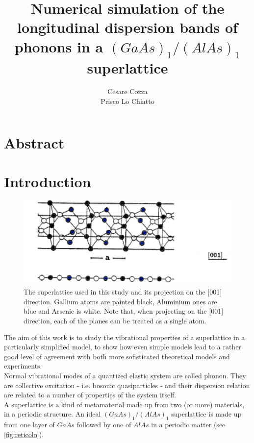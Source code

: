 \documentclass{article}
\begin{document}
 
	
	\author{Cesare Cozza \\ Prisco Lo Chiatto }
	\title{Numerical simulation of the longitudinal dispersion bands of phonons in a $(GaAs)_1/(AlAs)_1$ superlattice}
	\maketitle
    \newpage
    
    
\section{Abstract}




\section{Introduction}
\begin{figure}
	\centering
	\includegraphics[scale=0.3]{reticolo.jpg}
	\caption{The superlattice used in this study and its projection on the [001] direction. Gallium atoms are painted black, Aluminium ones are blue and Arsenic is white. Note that, when projecting on the [001] direction, each of the planes can be treated as a single atom.}
	\label{fig:reticolo}
\end{figure}

The aim of this work is to study the vibrational properties of a superlattice in a particularly simplified model, to show how even simple models lead to a rather good level of agreement with both more sofisticated theoretical models and experiments.\\
Normal vibrational modes of a quantized elastic system are called phonon. They are collective excitation - i.e. bosonic quasiparticles - and their dispersion relation are related to a number of properties of the system itself. \\
A superlattice is a kind of metamaterial made up from two (or more) materials, in a periodic structure. An ideal $(GaAs)_1/(AlAs)_1$ superlattice is made up from one layer of $GaAs$ followed by one of $AlAs$ in a periodic matter (see \autoref{fig:reticolo}).\smallskip
\end{document}

